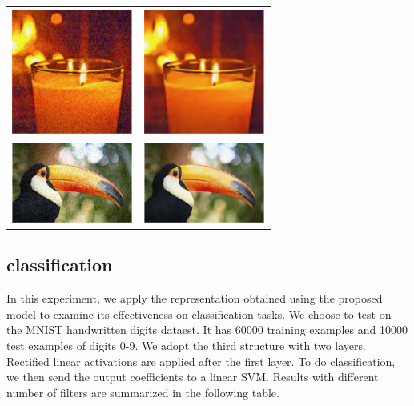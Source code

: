 \documentclass[a4paper]{article}
\begin{document}
\begin{center}
\begin{tabular}{c c}
\includegraphics[width=4cm]{./figures/candle_noise.eps} & \includegraphics[width=4cm]{./figures/candle_clean.eps}\\
\includegraphics[width=4cm]{./figures/bird_noise.eps} & \includegraphics[width=4cm]{./figures/bird_clean.eps}\\
\end{tabular}
\end{center}

\subsection{classification}
In this experiment, we apply the representation obtained using the proposed model to examine its effectiveness on classification tasks. We choose to test on the MNIST handwritten digits dataest. It has 60000 training examples and 10000 test examples of digits 0-9. We adopt the third structure with two layers. Rectified linear activations are applied after the first layer. To do classification, we then send the output coefficients to a linear SVM.  Results with different number of filters are summarized in the following table.
\end{document}
